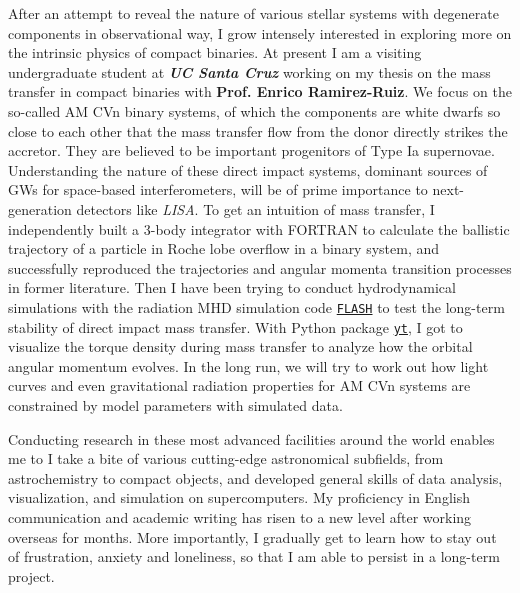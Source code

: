 \documentclass[11pt, a4paper]{awesome-cv} %
\begin{document}
\begin{cvletter}
After an attempt to reveal the nature of various stellar systems with degenerate components in observational way, I grow intensely interested in exploring more on the intrinsic physics of compact binaries. At present I am a visiting undergraduate student at \textbf{\textit{UC Santa Cruz}} working on my thesis on the mass transfer in compact binaries with \textbf{Prof. Enrico Ramirez-Ruiz}. We focus on the so-called AM CVn binary systems, of which the components are white dwarfs so close to each other that the mass transfer flow from the donor directly strikes the accretor. They are believed to be important progenitors of Type Ia supernovae. Understanding the nature of these direct impact systems, dominant sources of GWs for space-based interferometers, will be of prime importance to next-generation detectors like \textit{LISA}. To get an intuition of mass transfer, I independently built a 3-body integrator with FORTRAN to calculate the ballistic trajectory of a particle in Roche lobe overflow in a binary system, and successfully reproduced the trajectories and angular momenta transition processes in former literature. Then I have been trying to conduct hydrodynamical simulations with the radiation MHD simulation code \href{http://flash.uchicago.edu/site/}{\texttt{FLASH}} to test the long-term stability of direct impact mass transfer. With Python package \href{https://yt-project.org}{\texttt{yt}}, I got to visualize the torque density during mass transfer to analyze how the orbital angular momentum evolves. In the long run, we will try to work out how light curves and even gravitational radiation properties for AM CVn systems are constrained by model parameters with simulated data.

Conducting research in these most advanced facilities around the world enables me to I take a bite of various cutting-edge astronomical subfields, from astrochemistry to compact objects, and developed general skills of data analysis, visualization, and simulation on supercomputers. My proficiency in English communication and academic writing has risen to a new level after working overseas for months. More importantly, I gradually get to learn how to stay out of frustration, anxiety and loneliness, so that I am able to persist in a long-term project.



\end{cvletter}
\end{document}
